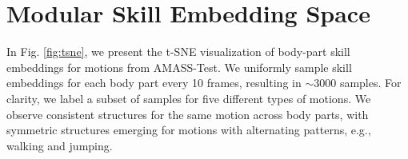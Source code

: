 \section{Modular Skill Embedding Space}
\label{sec:viz}
In Fig. \ref{fig:tsne}, we present the t-SNE visualization of body-part skill embeddings for motions from AMASS-Test. We uniformly sample skill embeddings for each body part every 10 frames, resulting in $\sim$3000 samples. For clarity, we label a subset of samples for five different types of motions. We observe consistent structures for the same motion across body parts, with symmetric structures emerging for motions with alternating patterns, e.g., walking and jumping.

